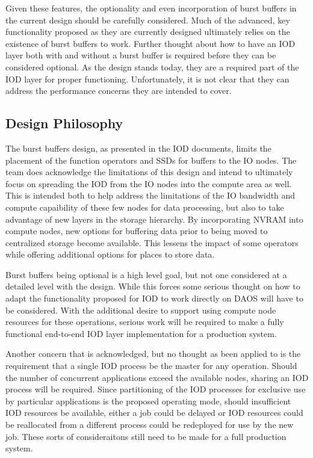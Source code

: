 \documentclass[conference]{sig-alt-gov2}
\begin{document}
Given these features, the optionality and even incorporation of burst buffers
in the current design should be carefully considered. Much of the advanced, key
functionality proposed as they are currently designed ultimately relies on the
existence of burst buffers to work. Further thought about how to have an IOD
layer both with and without a burst buffer is required before they can be
considered optional. As the design stands today, they are a required part of
the IOD layer for proper functioning. Unfortunately, it is not clear that they
can address the performance concerns they are intended to cover.

\subsection{Design Philosophy}
The burst buffers design, as presented in the IOD documents, limits the
placement of the function operators and SSDs for buffers to the IO nodes. The
team does acknowledge the limitations of this design and intend to ultimately
focus on spreading the IOD from the IO nodes into the compute area as well.
This is intended both to help address the limitations of the IO bandwidth
and compute capaibility of these few nodes for data processing, but also to
take advantage of new layers in the storage hierarchy. By incorporating NVRAM
into compute nodes, new options for buffering data prior to being moved to
centralized storage become available. This lessens the impact of some operators
while offering additional options for places to store data.

Burst buffers being optional is a high level goal, but not one considered at a
detailed level with the design. While this forces some serious thought on how
to adapt the functionality proposed for IOD to work directly on DAOS will have
to be considered. With the additional desire to support using compute node
resources for these operations, serious work will be required to make a fully
functional end-to-end IOD layer implementation for a production system.

Another concern that is acknowledged, but no thought as been applied to is the
requirement that a single IOD process be the master for any operation. Should
the number of concurrent applications exceed the available nodes, sharing an
IOD process will be required. Since partitioning of the IOD processes for
exclusive use by particular applications is the proposed operating mode, should
insufficient IOD resources be available, either a job could be delayed or IOD
resources could be reallocated from a different process could be redeployed for
use by the new job. These sorts of consideraitons still need to be made for a
full production system.
\end{document}
